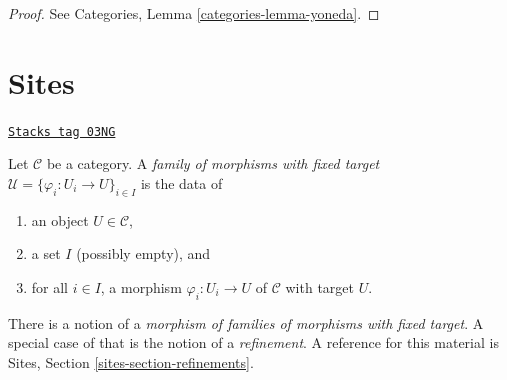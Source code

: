 \begin{proof}
See
Categories, Lemma \ref{categories-lemma-yoneda}.
\end{proof}

\section{Sites}
\label{etale-cohomology-section-sites}
\begin{definition}
\label{etale-cohomology-definition-family-morphisms-fixed-target}
\href{https://stacks.math.columbia.edu/tag/03NG}{\texttt{Stacks tag 03NG}}

Let $\mathcal{C}$ be a category. A {\it family of morphisms with fixed target}
$\mathcal{U} = \{\varphi_i : U_i \to U\}_{i\in I}$ is the data of
\begin{enumerate}
\item an object $U \in \mathcal{C}$,
\item a set $I$ (possibly empty), and
\item for all $i\in I$, a morphism $\varphi_i : U_i \to U$ of $\mathcal{C}$
with target $U$.
\end{enumerate}
\end{definition}

There is a notion of a {\it morphism of families of morphisms with fixed
target}. A special case of that is the notion of a {\it refinement}.
A reference for this material is
Sites, Section \ref{sites-section-refinements}.

